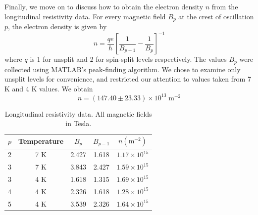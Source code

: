 \documentclass[aps,prl,nofootinbib,twocolumn,superscriptaddress,groupedaddress]{revtex4}  %
\begin{document}
Finally, we move on to discuss how to obtain the electron density $n$ from the longitudinal resistivity data. For every magnetic field $B_{p}$ at the crest of oscillation $p$, the electron density is given by $$n = \frac{qe}{h}\left[\frac{1}{B_{p + 1}} - \frac{1}{B_{p}}\right]^{-1}$$
where $q$ is 1 for unsplit and 2 for spin-split levels respectively. The values $B_{p}$ were collected using MATLAB's peak-finding algorithm. We chose to examine only unsplit levels for convenience, and restricted our attention to values taken from 7 K and 4 K values. We obtain $$n = (147.40 \pm 23.33) \times 10^{13} \; \mathrm{m}^{-2}$$ 

\begin{table}[t]
\caption{Longitudinal resistivity data. All magnetic fields in Tesla.}
\begin{ruledtabular}
\begin{tabular}{ccccc}
$p$ & Temperature & $B_{p}$ & $B_{p-1}$ & $n (\mathrm{m}^{-2}) $\\
\hline
\hline
2 & 7 K & 2.427 & 1.618 & $1.17 \times 10^{15}$\\
3 & 7 K & 3.843 & 2.427 & $1.59 \times 10^{15}$\\
3 & 4 K & 1.618 & 1.315 & $1.69 \times 10^{15}$\\
4 & 4 K & 2.326 & 1.618 & $1.28 \times 10^{15}$\\
5 & 4 K & 3.539 & 2.326 & $1.64 \times 10^{15}$\\
\end{tabular}
\end{ruledtabular}
\end{table}
\vspace{-2\baselineskip}
\end{document}
